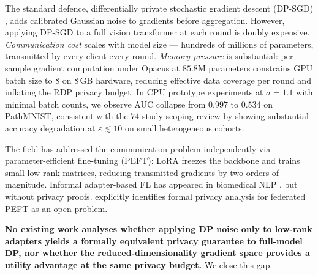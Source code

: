 ﻿\documentclass{article}
\renewcommand{\eps}{\varepsilon}
\newcommand{\noise}{\sigma}
\begin{document}
The standard defence, differentially private stochastic gradient descent
(DP-SGD) \citep{abadi2016deep}, adds calibrated Gaussian noise
to gradients before aggregation.
However, applying DP-SGD to a full vision transformer at each round is
doubly expensive.
\emph{Communication cost} scales with model size --- hundreds of millions of
parameters, transmitted by every client every round.
\emph{Memory pressure} is substantial: per-sample gradient computation under
Opacus at $85.8$M parameters constrains GPU batch size to $8$ on $8$\,GB
hardware, reducing effective data coverage per round and inflating the
RDP privacy budget.
In CPU prototype experiments at $\noise{=}1.1$ with minimal batch counts,
we observe AUC collapse from $0.997$ to $0.534$ on PathMNIST, consistent
with the $74$-study scoping review by
\citet{mohammadi2025differential} showing substantial accuracy degradation
at $\eps \lesssim 10$ on small heterogeneous cohorts.

The field has addressed the communication problem independently via
parameter-efficient fine-tuning (PEFT): LoRA
\citep{hu2022lora} freezes the backbone and trains small
low-rank matrices, reducing transmitted gradients by two orders of
magnitude.
Informal adapter-based FL has appeared in biomedical NLP
\citep{li2024federated}, but without privacy proofs.
\citet{li2024federated} explicitly identifies formal privacy
analysis for federated PEFT as an open problem.

\textbf{No existing work analyses whether applying DP noise only to
low-rank adapters yields a formally equivalent privacy guarantee to
full-model DP, nor whether the reduced-dimensionality gradient space
provides a utility advantage at the same privacy budget.}
We close this gap.
\end{document}
